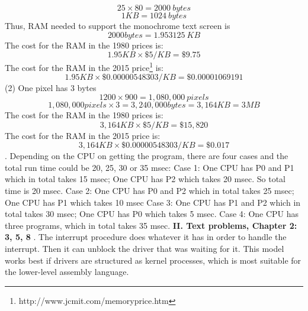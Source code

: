 \documentclass[12pt]{article}
\begin{document}
\begin{equation}
25 \times 80 = 2000  \ bytes 
\end{equation} 
\begin{equation}
1 KB = 1024 \ bytes
\end{equation}
Thus, RAM needed to support the monochrome text screen is
\begin{equation}
 2000 bytes = 1.953125 \ KB
 \end{equation}
 The cost for the RAM in the 1980 prices is:
 \begin{equation}
 1.95KB \times \$5/KB = \$9.75
 \end{equation}
 The cost for the RAM in the 2015 price\footnote{http://www.jcmit.com/memoryprice.htm} is:
 \begin{equation}
 1.95KB \times \$0.00000548303/KB = \$0.00001069191
\end{equation}
\newline
(2) One pixel has 3 bytes
\begin{equation}
1200 \times 900 = 1,080,000 \ pixels
\end{equation}
\begin{equation}
1,080,000 pixels \times 3 = 3,240,000 bytes = 3,164KB = 3MB
\end{equation}
The cost for the RAM in the 1980 prices is:
 \begin{equation}
 3,164KB \times \$5/KB = \$15,820
 \end{equation}
The cost for the RAM in the 2015 price is:
 \begin{equation}
3,164KB \times \$0.00000548303/KB = \$0.017
\end{equation} 
. Depending on the CPU on getting the program, there are four cases and the total run time could be 20, 25, 30 or 35 msec:\hfill \break
Case 1: \hfill \break
One CPU has P0 and P1 which in total takes 15 msec; One CPU has P2 which takes 20 msec. So total time is 20 msec. \hfill \break
Case 2: \hfill \break
One CPU has P0 and P2 which in total takes 25 msec; One CPU has P1 which takes 10 msec \hfill \break
Case 3: \hfill \break
One CPU has P1 and P2 which in total takes 30 msec; One CPU has P0 which takes 5 msec. \hfill \break
Case 4: \hfill \break
One CPU has three programs, which in total takes 35 msec. \hfill \break
\newline
\textbf{II. Text problems, Chapter 2: 3, 5, 8}\hfill \break 
{}. The interrupt procedure does whatever it has in order to handle the interrupt. Then it can unblock the driver that was waiting for it. This model works best if drivers are structured as kernel processes, which is most suitable for the lower-level assembly language. \hfill \break
\end{document}
